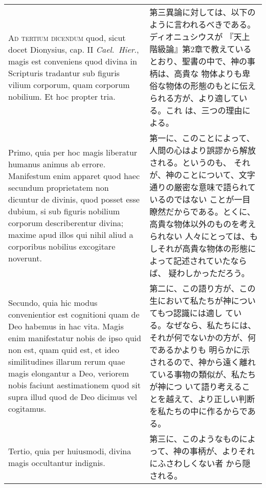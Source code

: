 \documentclass[10pt]{jsarticle}
\begin{document}
\begin{longtable}{p{21em}p{21em}}
\\


{\scshape Ad tertium dicendum} quod, sicut docet Dionysius, cap. II
{\itshape Cael.~Hier}., magis est conveniens quod divina in Scripturis
tradantur sub figuris vilium corporum, quam corporum nobilium. Et hoc
propter tria.


&


第三異論に対しては、以下のように言われるべきである。ディオニュシウスが
『天上階級論』第2章で教えているとおり、聖書の中で、神の事柄は、高貴な
物体よりも卑俗な物体の形態のもとに伝えられる方が、より適している。これ
は、三つの理由による。


\\

Primo, quia per hoc magis liberatur humanus animus ab
errore. Manifestum enim apparet quod haec secundum proprietatem non
dicuntur de divinis, quod posset esse dubium, si sub figuris nobilium
corporum describerentur divina; maxime apud illos qui nihil aliud a
corporibus nobilius excogitare noverunt.

&

第一に、このことによって、人間の心はより誤謬から解放される。というのも、
それが、神のことについて、文字通りの厳密な意味で語られているのではない
ことが一目瞭然だからである。とくに、高貴な物体以外のものを考えられない
人々にとっては、もしそれが高貴な物体の形態によって記述されていたならば、
疑わしかっただろう。


\\

Secundo, quia hic modus convenientior est cognitioni quam de Deo
habemus in hac vita. Magis enim manifestatur nobis de ipso quid non
est, quam quid est, et ideo similitudines illarum rerum quae magis
elongantur a Deo, veriorem nobis faciunt aestimationem quod sit supra
illud quod de Deo dicimus vel cogitamus.


&

第二に、この語り方が、この生において私たちが神についてもつ認識には適し
ている。なぜなら、私たちには、それが何でないかの方が、何であるかよりも
明らかに示されるので、神から遠く離れている事物の類似が、私たちが神につ
いて語り考えることを越えて、より正しい判断を私たちの中に作るからである。


\\

Tertio, quia per huiusmodi, divina magis occultantur indignis.

&


第三に、このようなものによって、神の事柄が、よりそれにふさわしくない者
から隠される。

\end{longtable}
\newpage
\end{document}
